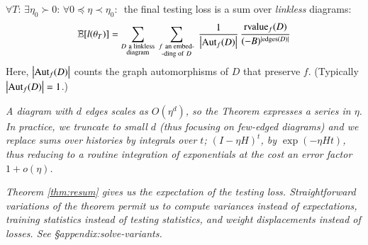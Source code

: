 {            \begin{thm} \label{thm:resum}
                $\forall T:\, \exists \eta_0 \succ 0:\,
                \forall 0\preceq \eta \prec \eta_0:\,$
                the final testing loss is
                a sum over \emph{linkless} diagrams: 
                    \squash
                \begin{equation*} \label{eq:resum}
                    \expc[l(\theta_T)]=
                    \sum_{\substack{D~\text{a linkless} \\ \text{diagram}}}
                    ~
                    \sum_{\substack{f~\text{an embed-} \\ \text{-ding of}~D}}
                    ~
                    \frac{1}{\wabs{\Aut_f(D)}}
                    \,
                    \frac{{\rvalue_f}(D)}{(-B)^{|\edges(D)|}}
                    \squash
                \end{equation*}
                Here, $\left|\text{\textnormal{Aut}}_f(D)\right|$ counts the graph automorphisms of $D$
                that preserve $f$. (Typically $\left|\text{\textnormal{Aut}}_f(D)\right|=1$.)%
            \end{thm}
            \begin{rmk} \label{rmk:integrate}
                \emph{
                A diagram with $d$ edges scales as
                $O(\eta^d)$, so the Theorem expresses a series in $\eta$.  In
                practice, we truncate to small $d$ (thus focusing on few-edged
                diagrams) and we replace sums over histories by integrals over
                $t$; $(I-\eta H)^t$, by $\exp(- \eta H t)$, thus reducing to a
                routine integration of exponentials at the cost an error factor
                $1 + o(\eta)$.}\mend
            \end{rmk}
            \begin{rmk}
                \emph{Theorem \ref{thm:resum} gives us the expectation of 
                the testing loss.  Straightforward variations of the theorem permit us
                to compute variances instead of expectations, training
                statistics instead of testing statistics, and weight
                displacements instead of losses.  See \S{appendix:solve-variants}.}\mend
            \end{rmk}
}
